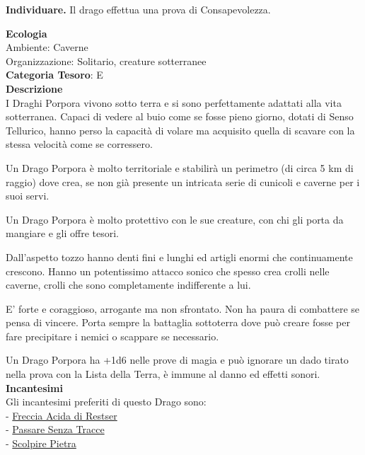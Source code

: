\begin{multicols}{2}
{\textbf{Individuare.} Il drago effettua una prova di Consapevolezza.

\textbf{Ecologia}\\
Ambiente: Caverne\\
Organizzazione: Solitario, creature sotterranee\\
\textbf{Categoria Tesoro}: E\\
\textbf{Descrizione}\\
I Draghi Porpora vivono sotto terra e si sono perfettamente adattati alla vita sotterranea.
Capaci di vedere al buio come se fosse pieno giorno, dotati di Senso Tellurico, hanno perso la capacità di volare ma acquisito quella di scavare con la stessa velocità come se corressero.

Un Drago Porpora è molto territoriale e stabilirà un perimetro (di circa 5 km di raggio) dove crea, se non già presente un intricata serie di cunicoli e caverne per i suoi servi.

Un Drago Porpora è molto protettivo con le sue creature, con chi gli porta da mangiare e gli offre tesori.

Dall'aspetto tozzo hanno denti fini e lunghi ed artigli enormi che continuamente crescono. Hanno un potentissimo attacco sonico che spesso crea crolli nelle caverne, crolli che sono completamente indifferente a lui.

E' forte e coraggioso, arrogante ma non sfrontato. Non ha paura di combattere se pensa di vincere. Porta sempre la battaglia sottoterra dove può creare fosse per fare precipitare i nemici o scappare se necessario.

Un Drago Porpora ha +1d6 nelle prove di magia e può ignorare un dado tirato nella prova con la Lista della Terra, è immune al danno ed effetti sonori.\\
\textbf{Incantesimi}\\
Gli incantesimi preferiti di questo Drago sono:\\
- \hyperlink{Freccia Acida di Restser}{Freccia Acida di Restser}\\
- \hyperlink{Passare Senza Tracce}{Passare Senza Tracce}\\
- \hyperlink{Scolpire Pietra}{Scolpire Pietra}

}
\end{multicols}

